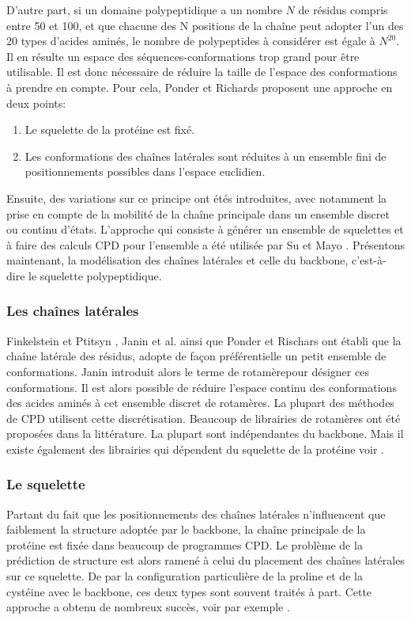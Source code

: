 D'autre part, si un domaine polypeptidique a un nombre $N$ de résidus compris entre 50 et 100, et que chacune des N positions de la chaîne peut adopter l'un des 20 types d'acides aminés, le nombre de polypeptides à considérer est égale à  $N^{20}$. Il en résulte un espace des séquences-conformations trop grand pour être utilisable. Il est donc nécessaire de réduire la taille de l'espace des conformations à prendre en compte. Pour cela, Ponder et Richards \cite{Ponder87} proposent une approche en deux points:
\begin{enumerate}[leftmargin=*]
\item Le squelette de la protéine est fixé.
\item Les conformations des chaînes latérales sont réduites à un ensemble fini de positionnements possibles dans l'espace euclidien.
\end{enumerate}  
Ensuite, des variations sur ce principe ont étés introduites, avec notamment la prise en compte de la mobilité de la chaîne principale dans un ensemble discret ou continu d'états. L'approche qui consiste à générer un ensemble de squelettes et à faire des calculs CPD pour l'ensemble a été utilisée par Su et Mayo \cite{Su97}. 
Présentons maintenant, la modélisation des chaînes latérales et celle du backbone, c'est-à-dire le squelette polypeptidique.

\subsubsection{Les chaînes latérales}

Finkelstein et Ptitsyn \cite{Finkelstein77}, Janin et al. \cite{Janin78} ainsi que Ponder et Rischars \cite{Ponder87} ont établi que la chaîne latérale des résidus, adopte de façon préférentielle un petit ensemble de conformations. Janin introduit alors le terme de \og rotamère\fg pour désigner ces conformations. Il est alors possible de réduire l'espace continu des conformations des acides aminés à cet ensemble discret de rotamères. La plupart des méthodes de CPD utilisent cette discrétisation. Beaucoup de librairies de rotamères ont été proposées dans la littérature. La plupart sont indépendantes du backbone. Mais il existe également des librairies qui dépendent du squelette de la protéine voir \cite{McGregor87,Dunbrack93}. 

\subsubsection{Le squelette}
Partant du fait que les positionnements des chaînes latérales n'influencent que faiblement la structure adoptée par le backbone, la chaîne principale de la protéine est fixée dans beaucoup de programmes CPD. Le problème de la prédiction de structure est alors ramené à celui du placement des chaînes latérales sur ce squelette. De par la configuration particulière de la proline et de la cystéine avec le backbone, ces deux types sont souvent traités à part. Cette approche a obtenu de nombreux succès, voir par exemple \cite{Dahiyat97b}.

